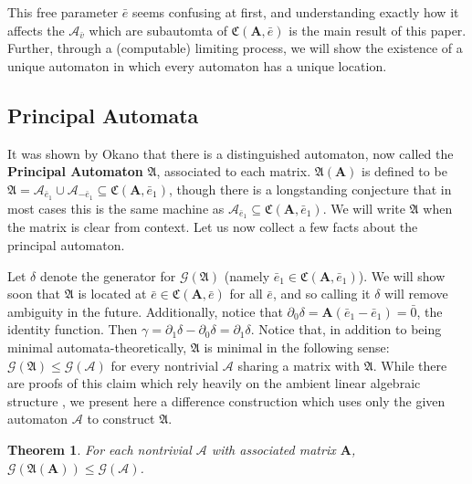 \documentclass[12pt]{article}
\newcommand{\A}{\mathcal{A}}
\newcommand{\G}{\mathcal{G}}
\renewcommand{\P}{\mathfrak{A}}
\newcommand{\C}{\mathfrak{C}(\Am,\e)}
\newcommand{\2}{\textbf{2}}
\newcommand{\Am}{\textbf{A}}
\newcommand{\del}{\partial}
\renewcommand{\v}{\bar{v}}
\newcommand{\e}{\bar{e}}
\newtheorem{thm}{Theorem}
\begin{document}
This free parameter $\e$ seems confusing at first, and understanding exactly
how it affects the $\A_{\v}$ which are subautomta of $\C$ is the main result 
of this paper. Further, through a (computable) limiting process, we will show 
the existence of a unique automaton in which every automaton has a 
unique location.

\subsection{Principal Automata}
It was shown by Okano \cite{Okano15:thesis} that there is a 
distinguished automaton, now called the \textbf{Principal Automaton} $\P$, 
associated to each matrix. $\P(\Am)$ is defined to be 
$\P = \A_{\e_1} \cup \A_{-\e_1} \subseteq \mathfrak{C}(\Am, \e_1)$,
though there is a longstanding conjecture that in most cases this is
the same machine as $\A_{\e_1} \subseteq \mathfrak{C}(\Am, \e_1)$.
We will write $\P$ when the matrix is clear from context.
Let us now collect a few facts about the principal automaton.

Let $\delta$ denote the generator for $\G(\P)$ 
(namely $\e_1 \in \mathfrak{C}(\Am, \e_1)$). We will show soon
that $\P$ is located at $\e \in \C$ for all $\e$,
and so calling it $\delta$ will remove ambiguity in the future.
Additionally, notice that $\del_0 \delta = \Am(\e_1 - \e_1) = \bar{0}$, 
the identity function. 
Then $\gamma = \del_1 \delta - \del_0 \delta = \del_1 \delta$.
Notice that, in addition to being minimal automata-theoretically, 
$\P$ is minimal in the following sense: 
$\G(\P) \leq \G(\A)$ for every nontrivial $\A$ sharing a matrix with $\P$. 
While there are proofs of this claim which rely heavily on the
ambient linear algebraic structure \cite{Okano15:thesis}, 
we present here a difference construction which uses only the given 
automaton $\A$ to construct $\P$.

\begin{thm}
  For each nontrivial $\A$ with associated matrix $\Am$,\\
  $\G(\P(\Am)) \leq \G(\A)$.
\end{thm}
\end{document}
